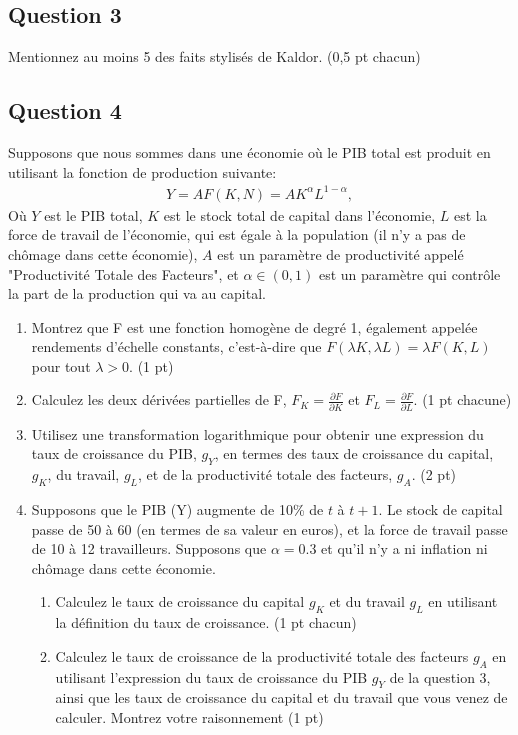 \documentclass[11pt]{article}
\begin{document}
\subsection*{Question 3}
Mentionnez au moins 5 des faits stylisés de Kaldor. (0,5 pt chacun)

\subsection*{Question 4}
Supposons que nous sommes dans une économie où le PIB total est produit en utilisant la fonction de production suivante:
\begin{align*}
    Y = A F(K,N) = A K^{\alpha} L^{1-\alpha},
\end{align*}
Où \(Y\) est le PIB total, \(K\) est le stock total de capital dans l'économie, \(L\) est la force de travail de l'économie, qui est égale à la population (il n'y a pas de chômage dans cette économie), \(A\) est un paramètre de productivité appelé "Productivité Totale des Facteurs", et \(\alpha \in (0,1)\) est un paramètre qui contrôle la part de la production qui va au capital.

\begin{enumerate}
    \item Montrez que F est une fonction homogène de degré 1, également appelée rendements d'échelle constants, c'est-à-dire que \(F(\lambda K, \lambda L) = \lambda F(K,L)\) pour tout \(\lambda > 0\). (1 pt)
    \item Calculez les deux dérivées partielles de F, \(F_K = \frac{\partial F }{\partial K} \) et \(F_{L} = \frac{\partial F }{\partial L} \). (1 pt chacune)
    \item Utilisez une transformation logarithmique pour obtenir une expression du taux de croissance du PIB, \(g_Y\), en termes des taux de croissance du capital, \(g_K\), du travail, \(g_L\), et de la productivité totale des facteurs, \(g_A\). (2 pt)
    \item Supposons que le PIB (Y) augmente de 10\% de \(t\) à \(t+1\). Le stock de capital passe de 50 à 60 (en termes de sa valeur en euros), et la force de travail passe de 10 à 12 travailleurs. Supposons que \(\alpha = 0.3\) et qu'il n'y a ni inflation ni chômage dans cette économie.
    \begin{enumerate}
        \item Calculez le taux de croissance du capital \(g_K\) et du travail \(g_L\) en utilisant la définition du taux de croissance. (1 pt chacun)
        \item Calculez le taux de croissance de la productivité totale des facteurs \(g_A\) en utilisant l'expression du taux de croissance du PIB \(g_Y\) de la question 3, ainsi que les taux de croissance du capital et du travail que vous venez de calculer. Montrez votre raisonnement (1 pt)
    \end{enumerate}
\end{enumerate}
\end{document}
